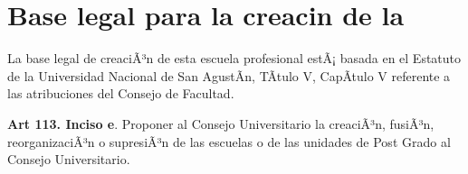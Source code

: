 \section{Base legal para la creaci n de la \SchoolFullName}

La base legal de creaciÃ³n de esta escuela profesional estÃ¡ basada en el Estatuto de la Universidad Nacional de San AgustÃ­n, TÃ­tulo V, CapÃ­tulo V referente a las atribuciones del Consejo de Facultad.

\textbf{Art 113. Inciso e}. Proponer al Consejo Universitario la creaciÃ³n, fusiÃ³n, reorganizaciÃ³n o supresiÃ³n de las escuelas o de las unidades de Post Grado al Consejo Universitario.
